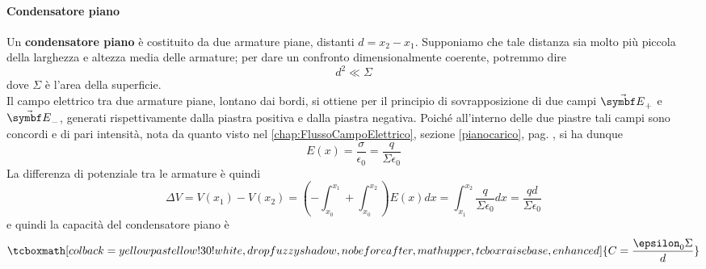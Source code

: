 \paragraph{Condensatore piano}
Un \textbf{condensatore piano} è costituito da due armature piane, distanti $d=x_2-x_1$. Supponiamo che tale distanza sia molto più piccola della larghezza e altezza media delle armature; per dare un confronto dimensionalmente coerente, potremmo dire
\begin{equation}
	d^2\ll \Sigma
\end{equation}
dove $\Sigma$ è l'area della superficie.\\
Il campo elettrico tra due armature piane, lontano dai bordi, si ottiene per il principio di sovrapposizione di due campi $\vba{E}_{+}$ e $\vba{E}_{-}$, generati rispettivamente dalla piastra positiva e dalla piastra negativa. Poiché all'interno delle due piastre tali campi sono concordi e di pari intensità, nota da quanto visto nel  \autoref{chap:FlussoCampoElettrico}, sezione \ref{pianocarico}, pag. \pageref{pianocarico}, si ha dunque
\begin{equation*}
	E(x)=\frac{\sigma}{\epsilon_0}=\frac{q}{\Sigma \epsilon_0}
\end{equation*}
La differenza di potenziale tra le armature è quindi
\begin{equation*}
	\Delta V=V(x_1)-V(x_2)=\left(-\int_{x_0}^{x_1}+\int_{x_0}^{x_2}\right)E(x)dx=\int_{x_1}^{x_2}\frac{q}{\Sigma \epsilon_0}dx=\frac{qd}{\Sigma \epsilon_0}
\end{equation*}
e quindi la capacità del condensatore piano è
\begin{equation}
	\tcboxmath[colback=yellowpastellow!30!white,drop fuzzy shadow, nobeforeafter, math upper, tcbox raise base, enhanced]{C=\frac{\epsilon_0\Sigma}{d}}
\end{equation}

